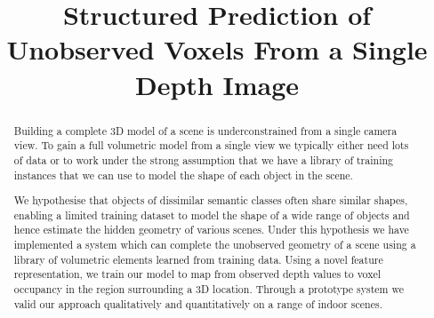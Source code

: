 \documentclass[10pt,twocolumn,letterpaper]{article}
\title{Structured Prediction of Unobserved Voxels From a Single Depth Image}
\begin{document}
\maketitle

\begin{abstract}

  Building a complete 3D model of a scene is underconstrained from a single camera view.
  To gain a full volumetric model from a single view we typically either need lots of data or to work under the strong assumption that we have a library of training instances that we can use to model the shape of each object in the scene.
  
  We hypothesise that objects of dissimilar semantic classes often share similar shapes, enabling a limited  training dataset to model the shape of a wide range of objects and hence estimate the hidden geometry of various scenes.
  Under this hypothesis we have implemented a system which can complete the unobserved geometry of a scene using a library of volumetric elements learned from training data.
  Using a novel feature representation, we train our model to map from observed depth values to voxel occupancy in the region surrounding a 3D location.
  Through a prototype system we valid our approach qualitatively and quantitatively on a range of indoor scenes.




\end{abstract}
\end{document}
